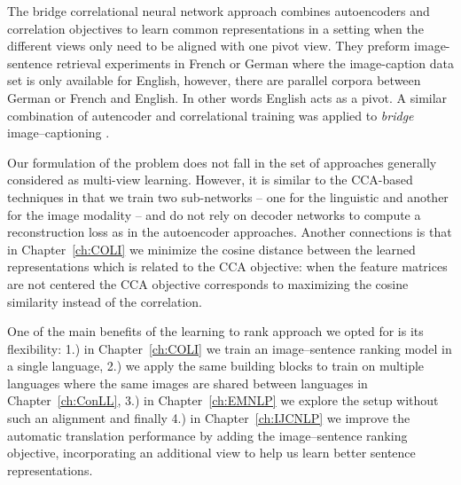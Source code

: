 The bridge correlational neural network approach \citep{rajendran2015bridge}
combines autoencoders and correlation objectives to
learn common representations in a setting when the different views only need to be
aligned with one pivot view. They preform
image-sentence retrieval experiments in French or German where
the image-caption data set is only available for English, however,
there are parallel corpora between German or French and English. In other words English acts as a pivot.
A similar combination of autencoder and correlational training was applied to \emph{bridge}
image--captioning \citep{Saha2016}.

Our formulation of the problem does not fall in the set of approaches generally
considered as multi-view learning.  However, it is similar to the CCA-based techniques in that we
train two sub-networks -- one for the linguistic and another for the image modality --
and do not rely on decoder networks to compute a reconstruction  loss as in the autoencoder approaches.
Another connections is that in Chapter~\ref{ch:COLI} we minimize the cosine distance between the learned representations
which is related to the CCA objective: when the feature matrices are not centered
the CCA objective corresponds to maximizing the cosine similarity instead of the correlation.

One of the main benefits of the learning to rank approach we opted for is
its flexibility: 1.) in Chapter~\ref{ch:COLI} we train an image--sentence ranking model in a single
language, 2.) we apply the same building blocks to train on multiple languages where
the same images are shared between languages in Chapter~\ref{ch:ConLL}, 3.) in
Chapter~\ref{ch:EMNLP} we explore the setup without such an alignment and finally 4.)
in Chapter~\ref{ch:IJCNLP} we improve the automatic translation  performance
by adding the image--sentence ranking objective, incorporating an additional view
to help us learn better sentence representations.

